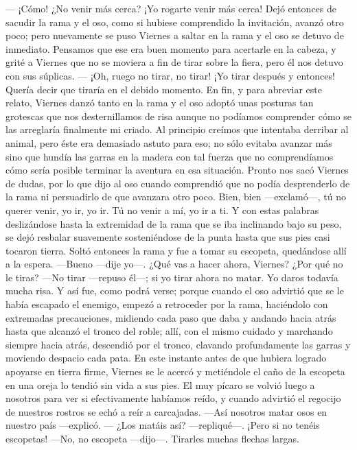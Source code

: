 \documentclass{novela}
\begin{document}
    — ¡Cómo! ¿No venir más cerca? ¡Yo rogarte venir más cerca!
    Dejó entonces de sacudir la rama y el oso, como si hubiese comprendido la invitación, avanzó otro poco; pero nuevamente se puso Viernes a saltar en la rama y el oso se detuvo de inmediato.
    Pensamos que ese era buen momento para acertarle en la cabeza, y grité a Viernes que no se moviera a fin de tirar sobre la fiera, pero él nos detuvo con sus súplicas.
    — ¡Oh, ruego no tirar, no tirar! ¡Yo tirar después y entonces!
    Quería decir que tiraría en el debido momento. En fin, y para abreviar este relato, Viernes danzó tanto en la rama y el oso adoptó unas posturas tan grotescas que nos desternillamos de risa aunque no podíamos comprender cómo se las arreglaría finalmente mi criado. Al principio creímos que intentaba derribar al animal, pero éste era demasiado astuto para eso; no sólo evitaba avanzar más sino que hundía las garras en la madera con tal fuerza que no comprendíamos cómo sería posible terminar la aventura en esa situación.
    Pronto nos sacó Viernes de dudas, por lo que dijo al oso cuando comprendió que no podía desprenderlo de la rama ni persuadirlo de que avanzara otro poco.
    Bien, bien —exclamó—, tú no querer venir, yo ir, yo ir. Tú no venir a mí, yo ir a ti.
    Y con estas palabras deslizándose hasta la extremidad de la rama que se iba inclinando bajo su peso, se dejó resbalar suavemente sosteniéndose de la punta hasta que sus pies casi tocaron tierra. Soltó entonces la rama y fue a tomar su escopeta, quedándose allí a la espera.
    —Bueno —dije yo—. ¿Qué vas a hacer ahora, Viernes? ¿Por qué no le tiras?
    —No tirar —repuso él—; si yo tirar ahora no matar. Yo daros todavía mucha risa.
    Y  así fue, como podrá verse; porque cuando el oso advirtió que se le había escapado el enemigo, empezó a retroceder por la rama, haciéndolo con extremadas precauciones, midiendo cada paso que daba y andando hacia atrás hasta que alcanzó el tronco del roble; allí, con el mismo cuidado y marchando siempre hacia atrás, descendió por el tronco, clavando profundamente las garras y moviendo despacio cada pata.
    En este instante antes de que hubiera logrado apoyarse en tierra firme, Viernes se le acercó y metiéndole el caño de la escopeta en una oreja lo tendió sin vida a sus pies.
    El muy pícaro se volvió luego a nosotros para ver si efectivamente habíamos reído, y cuando advirtió el regocijo de nuestros rostros se echó a reír a carcajadas.
    —Así nosotros matar osos en nuestro país —explicó.
    — ¿Los matáis así? —repliqué—. ¡Pero si no tenéis escopetas!
    —No, no escopeta —dijo—. Tirarles muchas flechas largas.
\end{document}
